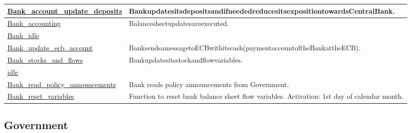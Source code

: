 \documentclass[a4paper,11pt]{article}
\begin{document}
\begin{longtable}[H!]{ll}
\midrule
\parbox{5cm}{\url{Bank_account_update_deposits}}  & \parbox{10cm}{BankupdatesitsdepositsandifneededreducesitsexpositiontowardsCentralBank.} \\
\midrule
\parbox{5cm}{\url{Bank_accounting}}  & \parbox{10cm}{Balancesheetupdatesareexecuted.} \\
\midrule
\parbox{5cm}{\url{Bank_idle}}  & \parbox{10cm}{} \\
\midrule
\parbox{5cm}{\url{Bank_update_ecb_account}}  & \parbox{10cm}{BanksendsamessagetoECBwithitscash(paymentaccountoftheBankattheECB).} \\
\midrule
\parbox{5cm}{\url{Bank_stocks_and_flows}}  & \parbox{10cm}{Bankupdatesitsstockandflowvariables.} \\
\midrule
\parbox{5cm}{\url{idle}}  & \parbox{10cm}{} \\
\midrule
\parbox{5cm}{\url{Bank_read_policy_announcements}}  & \parbox{10cm}{Bank reads policy announcements from Government.} \\
\midrule
\parbox{5cm}{\url{Bank_reset_variables}}  & \parbox{10cm}{Function to reset bank balance sheet flow variables. Activation: 1st day of calendar month.} \\
\end{longtable}

\subsection{Government}
\end{document}

